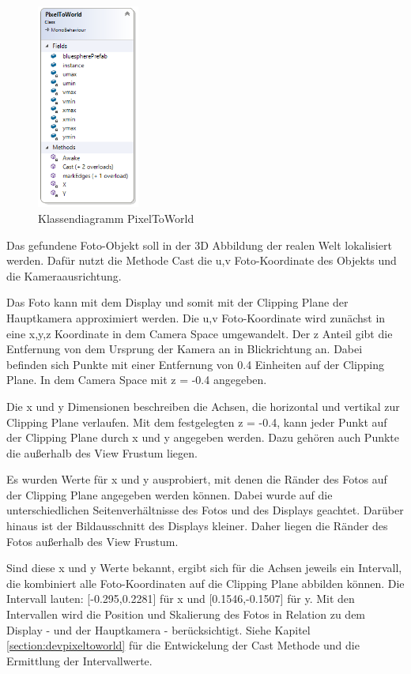 \documentclass[german,a4paper, 12pt]{llncs}
\begin{document}
\begin{figure}[H]
	\centering
	\includegraphics[width=0.3\textwidth]{images/dia_pixeltoworld.PNG}
	\caption[]{Klassendiagramm PixelToWorld}
	\label{dia:pixeltoworld}
\end{figure}

Das gefundene Foto-Objekt soll in der 3D Abbildung der realen Welt lokalisiert werden. Dafür nutzt die Methode Cast die u,v Foto-Koordinate des Objekts und die Kameraausrichtung.

Das Foto kann mit dem Display und somit mit der Clipping Plane der Hauptkamera approximiert werden.
Die u,v Foto-Koordinate wird zunächst in eine x,y,z Koordinate in dem Camera Space umgewandelt. Der z Anteil gibt die Entfernung von dem Ursprung der Kamera an in Blickrichtung an. Dabei befinden sich Punkte mit einer Entfernung von 0.4 Einheiten auf der Clipping Plane. In dem Camera Space mit z = -0.4 angegeben. 

Die x und y Dimensionen beschreiben die Achsen, die horizontal und vertikal zur Clipping Plane verlaufen. Mit dem festgelegten z = -0.4, kann jeder Punkt auf der Clipping Plane durch x und y angegeben werden. Dazu gehören auch Punkte die außerhalb des View Frustum liegen.

Es wurden Werte für x und y ausprobiert, mit denen die Ränder des Fotos auf der Clipping Plane angegeben werden können. Dabei wurde auf die unterschiedlichen Seitenverhältnisse des Fotos und des Displays geachtet. Darüber hinaus ist der Bildausschnitt des Displays kleiner. Daher liegen die Ränder des Fotos außerhalb des View Frustum. 

Sind diese x und y Werte bekannt, ergibt sich für die Achsen jeweils ein Intervall, die kombiniert alle Foto-Koordinaten auf die Clipping Plane abbilden können. Die Intervall lauten: [-0.295,0.2281] für x und [0.1546,-0.1507] für y. Mit den Intervallen wird die Position und Skalierung des Fotos in Relation zu dem Display - und der Hauptkamera - berücksichtigt. Siehe Kapitel \ref{section:devpixeltoworld} für die Entwickelung der Cast Methode und die Ermittlung der Intervallwerte.
\end{document}
